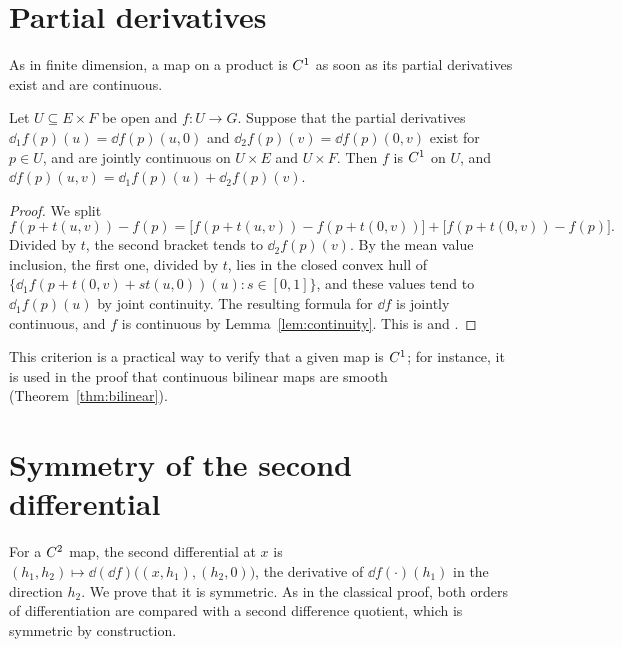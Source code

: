 \section{Partial derivatives}

As in finite dimension, a map on a product is $C^{1}$ as soon as its partial derivatives exist
and are continuous.

\begin{theorem}
  \label{thm:partials}
  \leanok
  Let $U \subseteq E \times F$ be open and $f \colon U \to G$. Suppose that the partial
  derivatives $\dd_1 f(p)(u) = \dd f(p)(u, 0)$ and $\dd_2 f(p)(v) = \dd f(p)(0, v)$ exist for
  $p \in U$, and are jointly continuous on $U \times E$ and $U \times F$. Then $f$ is $C^{1}$ on
  $U$, and $\dd f(p)(u, v) = \dd_1 f(p)(u) + \dd_2 f(p)(v)$.
\end{theorem}

\begin{proof}
  \leanok
  We split
  \[
    f(p + t(u,v)) - f(p) = \bigl[f(p + t(u,v)) - f(p + t(0,v))\bigr]
      + \bigl[f(p + t(0,v)) - f(p)\bigr].
  \]
  Divided by $t$, the second bracket tends to $\dd_2 f(p)(v)$. By the mean value inclusion, the
  first one, divided by $t$, lies in the closed convex hull of
  $\{\dd_1 f(p + t(0,v) + st(u,0))(u) : s \in [0,1]\}$, and these values tend to
  $\dd_1 f(p)(u)$ by joint continuity. The resulting formula for $\dd f$ is jointly continuous,
  and $f$ is continuous by Lemma~\ref{lem:continuity}. This is \cite[8.3]{Mic80} and \cite[1.2.8]{GN26}.
\end{proof}

This criterion is a practical way to verify that a given map is $C^{1}$; for instance, it is
used in the proof that continuous bilinear maps are smooth (Theorem~\ref{thm:bilinear}).

\section{Symmetry of the second differential}

For a $C^{2}$ map, the second differential at $x$ is
$(h_1, h_2) \mapsto \dd(\dd f)\bigl((x, h_1), (h_2, 0)\bigr)$, the derivative of
$\dd f(\cdot)(h_1)$ in the direction $h_2$. We prove that it is symmetric. As in the classical
proof, both orders of differentiation are compared with a second difference quotient, which is
symmetric by construction.

